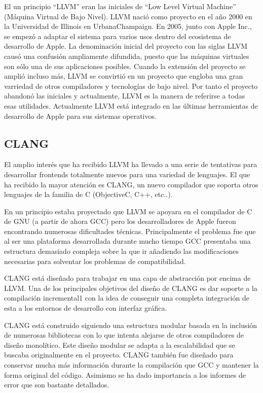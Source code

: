 El un principio ``LLVM'' eran las iniciales de ``Low Level Virtual Machine'' (M\'aquina Virtual de Bajo Nivel). LLVM naci\'o como proyecto en el año 2000 en la Universidad de Illinois en UrbanaChampaign. En 2005, junto con Apple Inc., se empez\'o a adaptar el sistema para varios usos dentro del ecosistema de desarrollo de Apple. La denominaci\'on inicial del proyecto con las siglas LLVM caus\'o una confusi\'on ampliamente difundida, puesto que las m\'aquinas virtuales son s\'olo una de sus aplicaciones posibles. Cuando la extensi\'on del proyecto se ampli\'o incluso m\'as, LLVM se convirti\'o en un proyecto que engloba una gran varriedad de otros compiladores y tecnolog\'ias de bajo nivel. Por tanto el proyecto abandon\'o las iniciales y actualmente, LLVM es la manera de referirse a todas esas utilidades. Actualmente LLVM est\'a integrado en las \'ultimas herramientas de desarrollo de Apple para sus sistemas operativos.

\subsection{CLANG}

El amplio inter\'es que ha recibido LLVM ha llevado a una serie de tentativas para desarrollar frontends totalmente nuevos para una variedad de lenguajes. El que ha recibido la mayor atenci\'on es CLANG, un nuevo compilador que soporta otros lenguajes de la familia de C (ObjectiveC, C++, etc..).

En un principio estaba proyectado que LLVM se apoyara en el compilador de C de GNU (a partir de ahora GCC) pero los desarrolladores de Apple fueron encontrando numerosas dificultades t\'ecnicas. Principalmente el problema fue que al ser una plataforma desarrollada durante mucho tiempo GCC presentaba una estructura demasiado compleja sobre la que ir añadiendo las modificaciones necesarias para solventar los problemas de compatibilidad.

CLANG est\'a diseñado para trabajar en una capa de abstracci\'on por encima de LLVM. Una de los principales objetivos del diseño de CLANG es dar soporte a la compilaci\'on incremental1 con la idea de conseguir una completa integraci\'on de esta a los entornos de desarrollo con interfaz gr\'afica.

CLANG est\'a construido siguiendo una estructura modular basada en la inclusi\'on de numerosas bibliotecas con lo que intenta alejarse de otros compiladores de diseño monol\'itico. Este diseño modular se adapta a la escalabilidad que se buscaba originalmente en el proyecto. CLANG tambi\'en fue diseñado para conservar mucha m\'as informaci\'on durante la compilaci\'on que GCC y mantener la forma original del c\'odigo. Asimismo se ha dado importancia a los informes de error que son bastante detallados.

